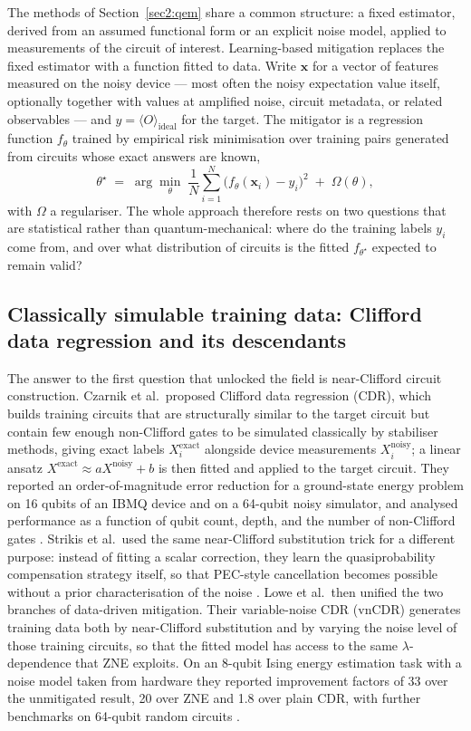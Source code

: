 \documentclass[Thesis.tex]{subfiles}
\begin{document}
The methods of Section~\ref{sec2:qem} share a common structure: a fixed
estimator, derived from an assumed functional form or an explicit noise model,
applied to measurements of the circuit of interest. Learning-based mitigation
replaces the fixed estimator with a function fitted to data. Write
$\mathbf{x}$ for a vector of features measured on the noisy device --- most
often the noisy expectation value itself, optionally together with values at
amplified noise, circuit metadata, or related observables --- and
$y = \langle O\rangle_{\mathrm{ideal}}$ for the target. The mitigator is a
regression function $f_{\theta}$ trained by empirical risk minimisation over
training pairs generated from circuits whose exact answers are known,
\begin{equation}
  \theta^{\star} \;=\; \arg\min_{\theta}\;
  \frac{1}{N}\sum_{i=1}^{N}\bigl(f_{\theta}(\mathbf{x}_{i}) - y_{i}\bigr)^{2}
  \;+\; \Omega(\theta),
  \label{eq2:erm}
\end{equation}
with $\Omega$ a regulariser. The whole approach therefore rests on two
questions that are statistical rather than quantum-mechanical: where do the
training labels $y_{i}$ come from, and over what distribution of circuits is
the fitted $f_{\theta^{\star}}$ expected to remain valid?

\subsection{Classically simulable training data: Clifford data regression and its descendants}

The answer to the first question that unlocked the field is near-Clifford
circuit construction. Czarnik et al.\ proposed Clifford data regression (CDR),
which builds training circuits that are structurally similar to the target
circuit but contain few enough non-Clifford gates to be simulated classically
by stabiliser methods, giving exact labels $X^{\mathrm{exact}}_{i}$ alongside
device measurements $X^{\mathrm{noisy}}_{i}$; a linear ansatz
$X^{\mathrm{exact}} \approx a X^{\mathrm{noisy}} + b$ is then fitted and
applied to the target circuit. They reported an order-of-magnitude error
reduction for a ground-state energy problem on 16 qubits of an IBMQ device and
on a 64-qubit noisy simulator, and analysed performance as a function of qubit
count, depth, and the number of non-Clifford gates \cite{czarnik2021clifford}.
Strikis et al.\ used the same near-Clifford substitution trick for a different
purpose: instead of fitting a scalar correction, they learn the
quasiprobability compensation strategy itself, so that PEC-style cancellation
becomes possible without a prior characterisation of the noise
\cite{strikis2021learning}. Lowe et al.\ then unified the two branches of
data-driven mitigation. Their variable-noise CDR (vnCDR) generates training
data both by near-Clifford substitution and by varying the noise level of those
training circuits, so that the fitted model has access to the same
$\lambda$-dependence that ZNE exploits. On an 8-qubit Ising energy estimation
task with a noise model taken from hardware they reported improvement factors
of 33 over the unmitigated result, 20 over ZNE and 1.8 over plain CDR, with
further benchmarks on 64-qubit random circuits \cite{lowe2021unified}.
\end{document}
